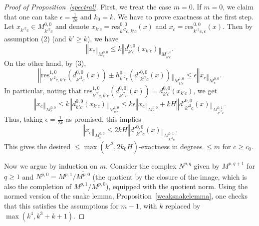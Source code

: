 \begin{proof}[{Proof of Proposition~\ref{spectral}}]
  \leanok
  First, we treat the case $m=0$.
  If $m=0$, we claim that one can take $\epsilon=\tfrac 1{2k}$ and $k_0=k$.
  We have to prove exactness at the first step.
  Let $x_{k'^2c}\in M^{0,0}_{k'^2c}$ and
  denote $x_{k'c}=\mathrm{res}_{k'^2c,k'c}^{0,0}(x)$
  and $x_c=\mathrm{res}_{k'^2c,c}^{0,0}(x)$.
  Then by assumption (2) (and $k'\geq k$), we have
  \[
  ‖x_c‖_{M^{0,0}_c}\leq k‖d^{0,0}_{k'c}(x_{k'c})‖_{M^{1,0}_{k'c}}.
  \]
  On the other hand, by (3),
  \[
  ‖\mathrm{res}_{k'^2c,k'c}^{1,0}(d^{0,0}_{k'^2c}(x))\pm h^0_{k'^2c}(d'^{0,0}_{k'^2c}(x))‖_{M^{1,0}_{k'c}}\leq \epsilon ‖x_c‖_{M^{0,0}_c}.
  \]
  In particular, noting that $\mathrm{res}_{k'^2c,k'c}^{1,0}(d^{0,0}_{k'^2c}(x)) = d^{0,0}_{k'c}(x_{k'c})$, we get
  \[
  ‖x_c‖_{M^{0,0}_c}\leq k‖d^{0,0}_{k'c}(x_{k'c})‖_{M^{1,0}_{k'c}}\leq k\epsilon ‖x_c‖_{M^{0,0}_c} + kH ‖d'^{0,0}_{k'^2c}(x)‖_{M^{0,1}_{k'^2c}}.
  \]
  Thus, taking $\epsilon=\tfrac 1{2k}$ as promised, this implies
  \[
  ‖x_c‖_{M^{0,0}_c}\leq 2kH ‖d'^{0,0}_{k'^2c}(x)‖_{M^{0,1}_{k'^2c}}.
  \]
  This gives the desired $\leq \max(k'^2,2k_0H)$-exactness in degrees $\leq m$ for $c\geq c_0$.

  Now we argue by induction on $m$.
  Consider the complex $N^{p,q}$ given by $M^{p,q+1}$ for $q\geq 1$
  and $N^{p,0} = M^{p,1}/\overline{M^{p,0}}$
  (the quotient by the closure of the image, which is also the completion of $M^{p,1}/M^{p,0}$),
  equipped with the quotient norm.
  Using the normed version of the snake lemma,
  Proposition~\ref{weaksnakelemma},
  one checks that this satisfies the assumptions for $m-1$,
  with $k$ replaced by $\max(k^4,k^3+k+1)$.
\end{proof}

